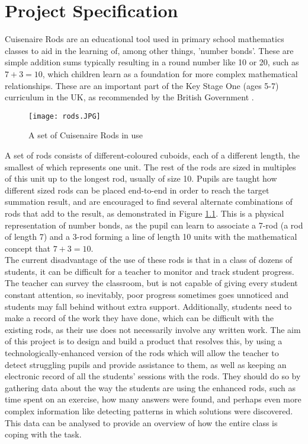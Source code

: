 \chapter{Project Specification}

Cuisenaire\textsuperscript{\textregistered} Rods \cite{TheCuise14:online} are an educational tool used in primary school mathematics classes to aid in the learning of, among other things, 'number bonds'. These are simple addition sums typically resulting in a round number like 10 or 20, such as $7+3=10$, which children learn as a foundation for more complex mathematical relationships. These are an important part of the Key Stage One (ages 5-7) curriculum in the UK, as recommended by the British Government \cite{Mathemat26:online}. 

\begin{figure}[h] 
  \texttt{[image: rods.JPG]}
  \centering
  \caption{A set of Cuisenaire\textsuperscript{\textregistered} Rods in use \cite{24Lesnom77:online}}
  \label{fig:rods}
\end{figure}

A set of rods consists of different-coloured cuboids, each of a different length, the smallest of which represents one unit. The rest of the rods are sized in multiples of this unit up to the longest rod, usually of size 10. Pupils are taught how different sized rods can be placed end-to-end in order to reach the target summation result, and are encouraged to find several alternate combinations of rods that add to the result, as demonstrated in Figure \ref{fig:rods}. This is a physical representation of number bonds, as the pupil can learn to associate a 7-rod (a rod of length 7) and a 3-rod forming a line of length 10 units with the mathematical concept that $7+3=10$. \\

The current disadvantage of the use of these rods is that in a class of dozens of students, it can be difficult for a teacher to monitor and track student progress. The teacher can survey the classroom, but is not capable of giving every student constant attention, so inevitably, poor progress sometimes goes unnoticed and students may fall behind without extra support. Additionally, students need to make a record of the work they have done, which can be difficult with the existing rods, as their use does not necessarily involve any written work. The aim of this project is to design and build a product that resolves this, by using a technologically-enhanced version of the rods which will allow the teacher to detect struggling pupils and provide assistance to them, as well as keeping an electronic record of all the students' sessions with the rods. They should do so by gathering data about the way the students are using the enhanced rods, such as time spent on an exercise, how many answers were found, and perhaps even more complex information like detecting patterns in which solutions were discovered. This data can be analysed to provide an overview of how the entire class is coping with the task.\\

